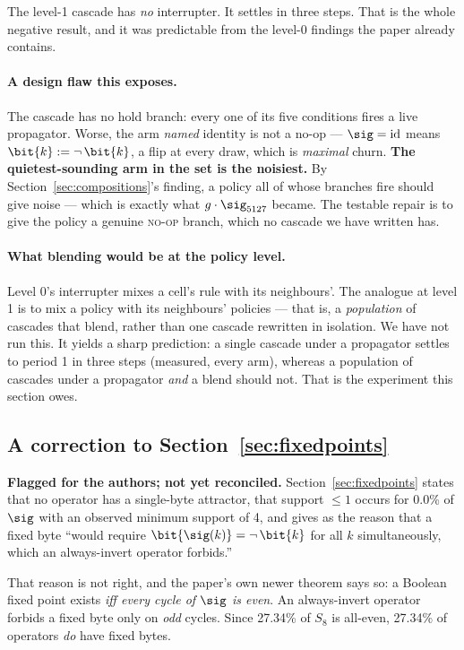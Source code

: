 The level-1 cascade has \emph{no} interrupter. It settles in three steps. That is
the whole negative result, and it was predictable from the level-0 findings the
paper already contains.

\paragraph{A design flaw this exposes.}
The cascade has no hold branch: every one of its five conditions fires a live
propagator. Worse, the arm \emph{named} $\mathrm{identity}$ is not a no-op ---
$\sig = \mathrm{id}$ means $\bit{k} := \lnot\,\bit{k}$, a flip at every draw, which
is \emph{maximal} churn. \textbf{The quietest-sounding arm in the set is the
noisiest.} By Section~\ref{sec:compositions}'s finding, a policy all of whose
branches fire should give noise --- which is exactly what
$g \cdot \sig_{5127}$ became. The testable repair is to give the policy a genuine
\textsc{no-op} branch, which no cascade we have written has.

\paragraph{What blending would be at the policy level.}
Level 0's interrupter mixes a cell's rule with its neighbours'. The analogue at
level 1 is to mix a policy with its neighbours' policies --- that is, a
\emph{population} of cascades that blend, rather than one cascade rewritten in
isolation. We have not run this. It yields a sharp prediction: a single cascade
under a propagator settles to period 1 in three steps (measured, every arm),
whereas a population of cascades under a propagator \emph{and} a blend should not.
That is the experiment this section owes.

\subsection{A correction to \texorpdfstring{Section~\ref{sec:fixedpoints}}{Exact fixed points}}

\textbf{Flagged for the authors; not yet reconciled.} Section~\ref{sec:fixedpoints}
states that no operator has a single-byte attractor, that support $\le 1$ occurs
for 0.0\% of $\sig$ with an observed minimum support of 4, and gives as the reason
that a fixed byte ``would require $\bit{\sig(k)} = \lnot\,\bit{k}$ for all $k$
simultaneously, which an always-invert operator forbids.''

That reason is not right, and the paper's own newer theorem says so: a Boolean
fixed point exists \emph{iff every cycle of $\sig$ is even}. An always-invert
operator forbids a fixed byte only on \emph{odd} cycles. Since 27.34\% of $S_8$ is
all-even, 27.34\% of operators \emph{do} have fixed bytes.

